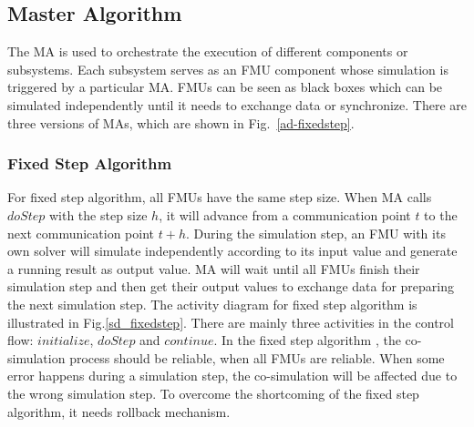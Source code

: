 \subsection{Master Algorithm}
The MA is used to orchestrate the execution of different components or subsystems. Each subsystem serves as an FMU component whose simulation is triggered by a particular MA. FMUs can be seen as black boxes which can be simulated independently until it needs to exchange data or synchronize. There are three versions of MAs, which are shown in Fig.~\ref{ad-fixedstep}.
\begin{figure}[htbp]
\end{figure}
\subsubsection{Fixed Step Algorithm}
For fixed step algorithm, all FMUs have the same step size. When MA calls $doStep$ with the step size $h$, it will advance from a communication point $t$ to the next communication point $t+h$. During the simulation step, an FMU with its own solver will simulate independently according to its input value and generate a running result as output value. MA will wait until all FMUs finish their simulation step and then get their output values to exchange data for preparing the next simulation step. The activity diagram for fixed step algorithm is illustrated in Fig.\ref{sd_fixedstep}. There are mainly three activities in the control flow: $initialize$, $doStep$ and $continue$. In the fixed step algorithm \cite{BromanBGLMTW13}, the co-simulation process should be reliable, when all FMUs are reliable. When some error happens during a simulation step, the co-simulation will be affected due to the wrong simulation step. To overcome the shortcoming of the fixed step algorithm, it needs rollback mechanism.
